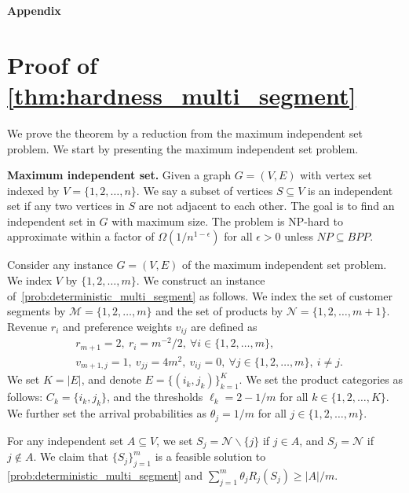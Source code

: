 \documentclass[msom,non-blindrev]{informs3} %
\theoremstyle{definition}
\begin{document}
\begin{appendices}{\Large \noindent\textbf{Appendix}}
{}


\section{Proof of \cref{thm:hardness_multi_segment}} \label{sec:thm:hardness_multi_segment}

We prove the theorem by a reduction from the maximum independent set problem. We start by presenting the maximum independent set problem.

\noindent\textbf{Maximum independent set.} Given a graph $G=(V,E)$ with vertex set indexed by $V=\{1,2,\dots,n\}$. We say a subset of vertices $S\subseteq V$ is an independent set if any two vertices in $S$ are not adjacent to each other. The goal is to find an independent set in $G$ with maximum size. The problem is NP-hard to approximate within a factor of $\Omega(1/n^{1-\epsilon})$ for all $\epsilon>0$ unless $NP\subseteq BPP$.
 
 Consider any instance $G=(V,E)$ of the maximum independent set problem. We index $V$ by $\{1,2,\dots,m\}$. We construct an instance of~\eqref{prob:deterministic_multi_segment} as follows. We index the set of customer segments by $\mathcal{M}=\{1,2,\dots,m\}$ and the set of products by $\mathcal{N}=\{1,2,\dots,m+1\}$. Revenue $r_i$ and preference weights $v_{ij}$ are defined as
\begin{align*}
		&r_{m+1}=2,\ r_i=m^{-2}/2,\ \forall i\in\{1,2,\dots,m\},\\
		&v_{m+1,j}=1,\ v_{jj}=4m^2,\ v_{ij}=0,\ \forall j\in\{1,2,\dots,m\},\ i\neq j.
	\end{align*}
We set $K=|E|$, and denote $E=\{(i_k,j_k)\}_{k=1}^K$. We set the product categories as follows: $C_k=\{i_k,j_k\}$, and the thresholds $\ell_k=2-1/m$ for all $k\in\{1,2,\dots,K\}$. We further set the arrival probabilities  as $\theta_j=1/m$ for all $j\in\{1,2,\dots,m\}$. 


		
For any independent set $A\subseteq V$, we set $S_j=\mathcal{N}\backslash\{j\}$ if $j\in A$, and $S_j=\mathcal{N}$ if $j\notin A$. We claim that $\{S_j\}_{j=1}^m$ is a feasible solution to \eqref{prob:deterministic_multi_segment} and $\sum_{j=1}^m \theta_jR_j(S_j)\geq |A|/m$.
		

\end{appendices}
\end{document}
